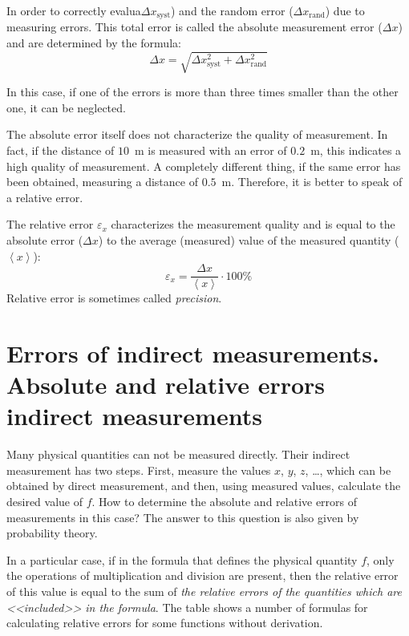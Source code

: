 \documentclass{LabWorkEng}
\begin{document}
In order to correctly evalua$\Delta x_\mathrm{syst}$) and the random error ($\Delta x_\mathrm{rand}$) due to measuring errors. This total error is called the absolute measurement error ($\Delta x$) and are determined by the formula:
\begin{equation}\label{total_err}
	\Delta x = \sqrt{\Delta x_\mathrm{syst}^2 +\Delta x_\mathrm{rand}^2}
\end{equation}

In this case, if one of the errors is more than three times smaller than the other one, it can be neglected.

The absolute error itself does not characterize the quality of measurement. In fact, if the distance of $10$~m is measured with an error of $0.2$~m, this indicates a high quality of measurement. A completely different thing, if the same error has been obtained, measuring a distance of $0.5$~m. Therefore, it is better to speak of a relative error.

The relative error $\varepsilon_x$ characterizes the measurement quality and is equal to the absolute error ($\Delta x$) to the average (measured) value of the measured quantity ($\left\langle x \right\rangle$):
\begin{equation}\label{rel_err}
	\varepsilon_x = \frac{{\Delta x}}{\left\langle x \right\rangle} \cdot 100\%
\end{equation}
Relative error is sometimes called \textit{precision}.

\section{Errors of indirect measurements. Absolute and relative errors indirect measurements}

Many physical quantities can not be measured directly. Their indirect measurement has two steps. First, measure the values $x$, $y$, $z$, \ldots , which can be obtained by direct measurement, and then, using measured values, calculate the desired value of  $f$. How to determine the absolute and relative errors of measurements in this case? The answer to this question is also given by probability theory.

In a particular case, if in the formula that defines the physical quantity $f$, only the operations of multiplication and division are present, then the relative error of this value is equal to the sum of \textit{the relative errors of the quantities which are <<included>> in the formula}. The table shows a number of formulas for calculating relative errors for some functions without derivation.
\end{document}
